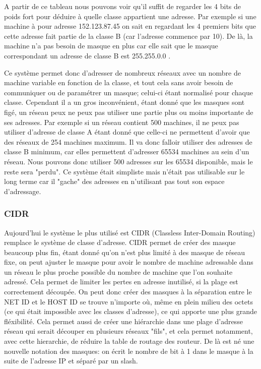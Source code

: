 A partir de ce tableau nous pouvons voir qu'il suffit de regarder les 4 bits de
poids fort pour déduire à quelle classe appartient une adresse.  Par exemple si
une machine à pour adresse 152.123.87.45 on sait en regardant les 4 premiers
bits que cette adresse fait partie de la classe B (car l'adresse commence par
10). De là, la machine n'a pas besoin de masque en plus car elle sait que le
masque correspondant un adresse de classe B est 255.255.0.0 .

Ce système permet donc d'adresser de nombreux réseaux avec un nombre de machine
variable en fonction de la classe, et tout cela sans avoir besoin de
communiquer ou de paramétrer un masque; celui-ci étant normalisé pour chaque
classe.  Cependant il a un gros inconvénient, étant donné que les masques sont
figé, un réseau peux ne peux pas utiliser une partie plus ou moins importante
de ses adresses. Par exemple si un réseau contient 500 machines, il ne peux pas
utiliser d'adresse de classe A étant donné que celle-ci ne permettent d'avoir
que des réseaux de 254 machines maximum. Il va donc falloir utiliser des
adresses de classe B minimum, car elles permettent d'adresser 65534 machines au
sein d'un réseau. Nous pouvons donc utiliser 500 adresses sur les 65534
disponible, mais le reste sera "perdu".  Ce système était simpliste mais
n'était pas utilisable sur le long terme car il "gache" des adresses en
n'utilisant pas tout son espace d'adressage.


\subsubsection{CIDR}

Aujourd'hui le système le plus utilisé est CIDR (Classless Inter-Domain
Routing) remplace le système de classe d'adresse. CIDR permet de créer des
masque beaucoup plus fin, étant donné qu'on n'est plus limité à des masque de
réseau fixe, on peut ajuster le masque pour avoir le nombre de machine
adressable dans un réseau le plus proche possible du nombre de machine que l'on
souhaite adressé.  Cela permet de limiter les pertes en adresse inutilisé, si
la plage est correctement découpée.  On peut donc créer des masques à la
séparation entre le NET ID et le HOST ID se trouve n'importe où, même en plein
milieu des octets (ce qui était impossible avec les classes d'adresse), ce qui
apporte une plus grande fléxibilité.  Cela permet aussi de créer une hiérarchie
dans une plage d'adresse réseau qui serait découper en plusieurs réseaux
"fils", et cela permet notamment, avec cette hierarchie, de réduire la table de
routage des routeur.  De là est né une nouvelle notation des masques: on écrit
le nombre de bit à 1 dans le masque à la suite de l'adresse IP et séparé par un
slash.


